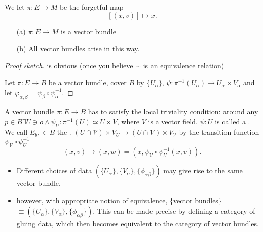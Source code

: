 We let \(\pi:E\to M\) be the forgetful map \[[(x,v)]\mapsto x.\]

\begin{lemma}\label{lem:8.3}
    \begin{enumerate}
        \item[(a)] \(\pi:E\to M\) is a vector bundle
        \item[(b)] All vector bundles arise in this way.  
    \end{enumerate}
\end{lemma}

\begin{proof}[Proof sketch]
     is obvious (once you believe \(\sim\) is an equivalence relation)

     Let \(\pi:E\to B\) be a vector bundle, cover 
    \(B\) by \(\{U_\alpha\}\), \(\psi:\pi^{-1}(U_\alpha)\to U_\alpha\times V_\alpha\) and let \(\varphi_{\alpha,\beta}=\psi_\beta\circ \psi_\alpha^{-1}\). \qedhere 
\end{proof}



 A vector bundle \(\pi:E\to B\) has to satisfy the local triviality condition: around any \(p\in B\exists U\ni o\land \psi_U:\pi^{-1}(U)\simeq U\times V\),
where \(V\) is a vector field. \(\psi:U\) is called a . We call 
\(E_b,\in B\) the . 
\((U\cap \mathcal{V})\times V_U \to (U\cap \mathcal{V})\times V_{\mathcal{V}}\) by the transition function 
\(\psi_\mathcal{V}\circ \psi_{U}^{-1}\)
\[(x,v)\mapsto (x,w)=(x,\psi_\mathcal{V}\circ \psi_{U}^{-1}(x,v)).\]





\begin{remark}
    \begin{itemize}
        \item Different choices of data \((\{U_\alpha\},\{V_\alpha\},\{\phi_{\alpha\beta}\})\) may give rise to 
              the same vector bundle.     
        \item however, with appropriate notion of equivalence, \{vector bundles\} \(\equiv (\{U_\alpha\},\{V_\alpha\},\{\phi_{\alpha\beta}\})\).
              This can be made precise by defining a category of gluing data, which then becomes equivalent to the category of vector bundles. 
    \end{itemize}
\end{remark}

